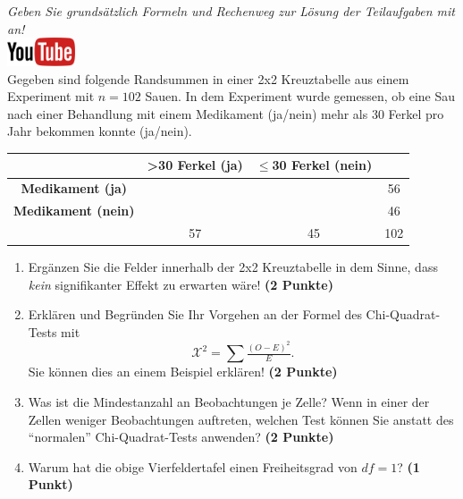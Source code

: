 \documentclass[a4paper, 9pt]{scrartcl}\usepackage[]{graphicx}\usepackage[]{xcolor}
\begin{document}
\textit{Geben Sie grunds{\"a}tzlich Formeln und Rechenweg zur L{\"o}sung der
  Teilaufgaben mit an!} \\[1Ex]

\hfill\href{https://youtu.be/jakM7fHyZfU}{\includegraphics[width =
  2cm]{img/youtube}}\\[1Ex]




Gegeben sind folgende Randsummen in einer 2x2 Kreuztabelle aus einem
Experiment mit $n = 102$ Sauen. In dem Experiment wurde gemessen,
ob eine Sau nach einer Behandlung mit einem Medikament (ja/nein)
mehr als 30 Ferkel pro Jahr bekommen konnte (ja/nein).

\vspace{5Ex}

\begin{center}
  \Large
  \begin{tabular}{c|c|c|c}
     & \textbf{>30 Ferkel (ja)} & \textbf{$\leq$30 Ferkel (nein)} &  \strut\\
    \hline
    \textbf{Medikament (ja)} & \phantom{100}  & \phantom{100}  &   56  \strut\\
    \hline
    \textbf{Medikament (nein)} & \phantom{100}  & \phantom{100}  &   46   \strut\\
    \hline
     &  57 &  45 &  102  \strut\\
  \end{tabular}
\end{center}



\vspace{5Ex}

\begin{enumerate}
\item Erg{\"a}nzen Sie die Felder innerhalb der 2x2 Kreuztabelle in dem Sinne,
  dass \textit{kein} signifikanter Effekt zu erwarten w{\"a}re!
  \textbf{(2 Punkte)}
\item Erkl{\"a}ren und Begr{\"u}nden Sie Ihr Vorgehen an der Formel des
  Chi-Quadrat-Tests mit
  \begin{equation*}
  \mathcal{X}^2 = \sum\tfrac{(O - E)^2}{E}.  
  \end{equation*}
  Sie k{\"o}nnen dies an einem Beispiel erkl{\"a}ren! \textbf{(2 Punkte)}
\item Was ist die Mindestanzahl an Beobachtungen je Zelle? Wenn in einer
  der Zellen weniger Beobachtungen auftreten, welchen Test k{\"o}nnen Sie
  anstatt des "`normalen"' Chi-Quadrat-Tests anwenden? \textbf{(2 Punkte)}
\item Warum hat die obige Vierfeldertafel einen Freiheitsgrad von $df=1$?
  \textbf{(1 Punkt)}
\end{enumerate} 
\clearpage
\end{document}
